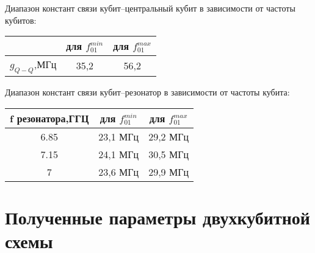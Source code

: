 \documentclass[12pt, twoside]{report}
\begin{document}
Диапазон констант связи кубит--центральный кубит в зависимости от частоты кубитов:
	\begin{center}
		\begin{tabular}{ | c | c | c |}
  	  	\hline
   		  &для $f_{01}^{min}$ &для $f_{01}^{max}$ \\ \hline
    		  $g_{Q-Q}$,МГц &35,2  & 56,2 \\ \hline
		\end{tabular}
	\end{center} 
	
Диапазон констант связи кубит--резонатор в зависимости от частоты кубита:
	\begin{center}
		\begin{tabular}{ | c | c | c |}
  	  	\hline
   		  f резонатора,ГГЦ&для $f_{01}^{min}$ &для $f_{01}^{max}$ \\ \hline
    		  6.85 &23,1 МГц & 29,2 МГц \\ \hline
    		  7.15 &24,1 МГц & 30,5 МГц \\ \hline
   	 	  7 &23,6 МГц & 29,9 МГц \\ \hline
		\end{tabular}
	\end{center} 
	
	\section{Полученные параметры двухкубитной схемы}
	
	
\end{document}
